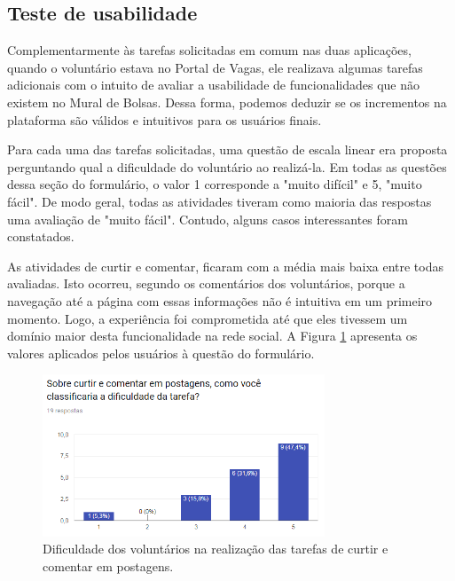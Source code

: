 \subsection{Teste de usabilidade}
\label {avaliacaoUsabilidade}

Complementarmente às tarefas solicitadas em comum nas duas aplicações, quando o voluntário estava no Portal de Vagas, ele realizava algumas tarefas adicionais com o intuito de avaliar a usabilidade de funcionalidades que não existem no Mural de Bolsas. Dessa forma, podemos deduzir se os incrementos na plataforma são válidos e intuitivos para os usuários finais.

Para cada uma das tarefas solicitadas, uma questão de escala linear era proposta perguntando qual a dificuldade do voluntário ao realizá-la. Em todas as questões dessa seção do formulário, o valor 1 corresponde a "muito difícil" e 5, "muito fácil". De modo geral, todas as atividades tiveram como maioria das respostas uma avaliação de "muito fácil". Contudo, alguns casos interessantes foram constatados. 

As atividades de curtir e comentar, ficaram com a média mais baixa entre todas avaliadas. Isto ocorreu, segundo os comentários dos voluntários, porque a navegação até a página com essas informações não é intuitiva em um primeiro momento. Logo, a experiência foi comprometida até que eles tivessem um domínio maior desta funcionalidade na rede social. A Figura \ref{avalGrafTUCurtir} apresenta os valores aplicados pelos usuários à questão do formulário.

\begin{figure}[h]
    \caption{Dificuldade dos voluntários na realização das tarefas de curtir e comentar em postagens.}
       	\begin{center}
            \includegraphics[width=0.75\textwidth]{figuras/avaliacao/pdv-4.png}
        \end{center}
    \label{avalGrafTUCurtir}
\end{figure} 


